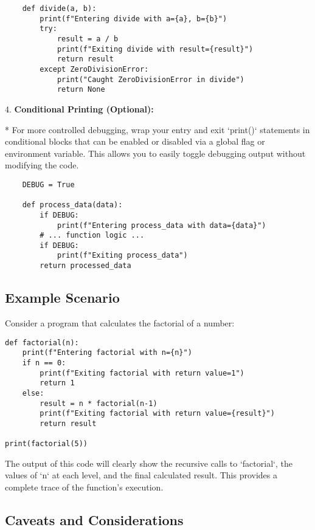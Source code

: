 \documentclass{article}
\begin{document}
    \begin{verbatim}
    def divide(a, b):
        print(f"Entering divide with a={a}, b={b}")
        try:
            result = a / b
            print(f"Exiting divide with result={result}")
            return result
        except ZeroDivisionError:
            print("Caught ZeroDivisionError in divide")
            return None
    \end{verbatim}

4.  \textbf{Conditional Printing (Optional):}

    *   For more controlled debugging, wrap your entry and exit `print()` statements in conditional blocks that can be enabled or disabled via a global flag or environment variable. This allows you to easily toggle debugging output without modifying the code.

    \begin{verbatim}
    DEBUG = True

    def process_data(data):
        if DEBUG:
            print(f"Entering process_data with data={data}")
        # ... function logic ...
        if DEBUG:
            print(f"Exiting process_data")
        return processed_data
    \end{verbatim}

\subsection*{Example Scenario}

Consider a program that calculates the factorial of a number:

\begin{verbatim}
def factorial(n):
    print(f"Entering factorial with n={n}")
    if n == 0:
        print(f"Exiting factorial with return value=1")
        return 1
    else:
        result = n * factorial(n-1)
        print(f"Exiting factorial with return value={result}")
        return result

print(factorial(5))
\end{verbatim}

The output of this code will clearly show the recursive calls to `factorial`, the values of `n` at each level, and the final calculated result. This provides a complete trace of the function's execution.

\subsection*{Caveats and Considerations}
\end{document}
